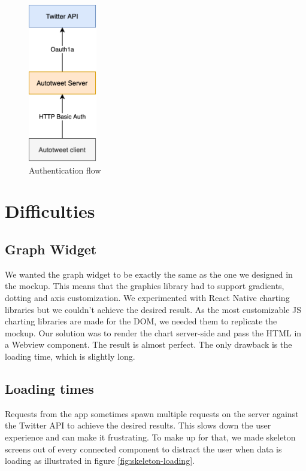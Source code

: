 \documentclass{report}
\begin{document}
\begin{figure}[htp]
    \centering
    \includegraphics[width=3cm]{diagram1}
    \caption{Authentication flow}
    \label{fig:diagram1}
\end{figure}

\chapter{Difficulties}

\section{Graph Widget}

We wanted the graph widget to be exactly the same as the one we designed in the mockup. This means that the graphics library had to support gradients, dotting and axis customization. We experimented with React Native charting libraries but we couldn't achieve the desired result. As the most customizable JS charting libraries are made for the DOM, we needed them to replicate the mockup. Our solution was to render the chart server-side and pass the HTML in a Webview component. The result is almost perfect. The only drawback is the loading time, which is slightly long.

\section{Loading times}

Requests from the app sometimes spawn multiple requests on the server against the Twitter API to achieve the desired results. This slows down the user experience and can make it frustrating. To make up for that, we made skeleton screens out of every connected component to distract the user when data is loading as illustrated in figure \ref{fig:skeleton-loading}.
\end{document}
